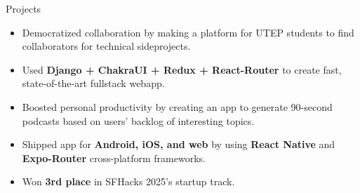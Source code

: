 \documentclass{resume} %
\begin{document}
\begin{workSection}{Projects}
	
	\customItem[
	title=\href{https://github.com/AshkanArabim/hackerhunt}{HackerHunt \faExternalLink},
	duration=Solo | January 2025 - present,
	]
	\begin{itemize}
		\vspace{-0.5em}
		\itemsep -6pt {}
		\item Democratized collaboration by making a platform for UTEP students to find collaborators for technical sideprojects. 
		\item Used \textbf{Django + ChakraUI + Redux + React-Router} to create fast, state-of-the-art fullstack webapp.
	\end{itemize}

	\customItem[
	title=\href{https://github.com/chesterCaii/back-logz/}{Backlogz \faExternalLink}, %
	duration=Team of 4 | April 2025,
	]
	\begin{itemize}
		\vspace{-0.5em}
		\itemsep -6pt {}
		\item Boosted personal productivity by creating an app to generate 90-second podcasts based on users' backlog of interesting topics.
		\item Shipped app for \textbf{Android, iOS, and web} by using \textbf{React Native} and \textbf{Expo-Router} cross-platform frameworks.
		\item Won \textbf{3rd place} in SFHacks 2025's startup track.
	\end{itemize}
	
	
	

\end{workSection}
\end{document}
